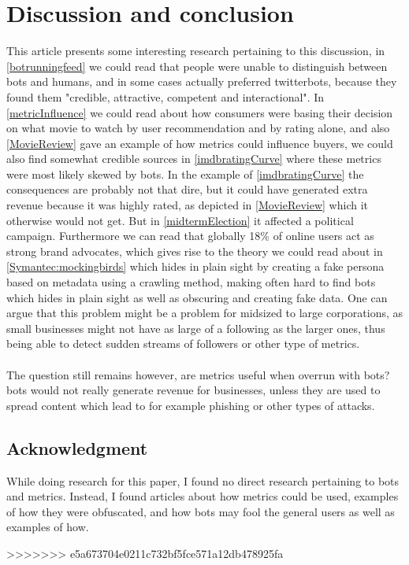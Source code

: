 \section{Discussion and conclusion}
This article presents some interesting research pertaining to this discussion, in \ref{botrunningfeed} we could read that people were unable to distinguish between bots and humans, and in some cases actually preferred twitterbots, because they found them "credible, attractive, competent and interactional"\cite{Edwards2014372}. In \ref{metricInfluence} we could read about how consumers were basing their decision on what movie to watch by user recommendation and by rating alone, and also \ref{MovieReview} gave an example of how metrics could influence buyers, we could also find somewhat credible sources in \ref{imdbratingCurve} where these metrics were most likely skewed by bots. In the example of \ref{imdbratingCurve} the consequences are probably not that dire, but it could have generated extra revenue because it was highly rated, as depicted in \ref{MovieReview} which it otherwise would not get. But in \ref{midtermElection} it affected a political campaign. Furthermore we can read that globally 18\% of online users act as strong brand advocates, which gives rise to the theory we could read about in \ref{Symantec:mockingbirds} which hides in plain sight by creating a fake persona based on  metadata using a crawling method, making often hard to find bots which hides in plain sight as well as obscuring and creating fake data. One can argue that this problem might be a problem for midsized to large corporations, as small businesses might not have as large of a following as the larger ones, thus being able to detect sudden streams of followers or other type of metrics.
\\
\\
The question still remains however, are metrics useful when overrun with bots? bots would not really generate revenue for businesses, unless they are used to spread content which lead to for example phishing or other types of attacks. 







\subsection*{Acknowledgment}
While doing research for this paper, I found no direct research pertaining to bots and metrics. Instead, I found articles about how metrics could be used, examples of how they were obfuscated, and how bots may fool the general users as well as examples of how. 







>>>>>>> e5a673704e0211c732bf5fce571a12db478925fa
